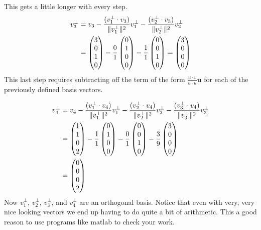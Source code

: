 {This gets a little longer with every step.
\begin{align*}
v_3^\bot &= v_3  -\frac{(v_1^\bot \cdot v_3 )}{\|v_1^\bot\|^2} v_1^\bot  -\frac{(v_2^\bot \cdot v_3 )}{\|v_2^\bot\|^2} v_2^\bot\\
&=\begin{pmatrix} 3\\0 \\ 1\\ 0 \end{pmatrix}- \frac{0}{1} \begin{pmatrix} 0\\1 \\ 0\\ 0 \end{pmatrix} - \frac{1}{1}  \begin{pmatrix} 0\\0\\ 1\\ 0 \end{pmatrix}  = \begin{pmatrix} 3\\0 \\ 0\\ 0 \end{pmatrix}
\end{align*}
This last step requires subtracting off the term of the form $\frac{u\cdot v}{u \cdot u} \mathbf{u}$ for each of the previously defined basis vectors.

\begin{align*}
v_4^\bot &= v_4  - \frac{(v_1^\bot \cdot v_4 )}{\|v_1^\bot\|^2} v_1^\bot  -\frac{(v_2^\bot \cdot v_4 )}{\|v_2^\bot\|^2} v_2^\bot  -\frac{(v_3^\bot \cdot v_4 )}{\|v_3^\bot\|^2} v_3^\bot \\
&= \begin{pmatrix} 1\\ 1\\ 0\\2 \end{pmatrix}  -\frac{1}{1}  \begin{pmatrix} 0\\1 \\ 0\\ 0 \end{pmatrix}  - \frac{0}{1} \begin{pmatrix} 0\\0\\ 1\\ 0 \end{pmatrix}  -\frac{3}{9}  \begin{pmatrix} 3\\0 \\ 0\\ 0 \end{pmatrix} \\
&= \begin{pmatrix} 0\\ 0\\ 0\\2 \end{pmatrix}
\end{align*}
Now $v_1^\bot$,  $v_2^\bot$, $v_3^\bot$, and $v_4^\bot$ are an orthogonal basis. Notice that even with very, very nice looking vectors we end up having to do quite a bit of arithmetic. This a good reason to use programs like matlab to check your work.
}

